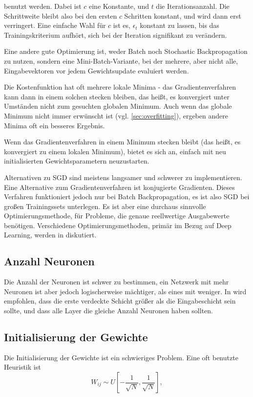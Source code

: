 benutzt werden. Dabei ist $c$ eine Konstante, und $t$ die Iterationsanzahl. Die Schrittweite bleibt also bei den ersten $c$ Schritten konstant, und wird dann erst verringert. Eine einfache Wahl für $c$ ist es, $\epsilon_t$ konstant zu lassen, bis das Trainingskriterium aufhört, sich bei der Iteration signifikant zu verändern.

Eine andere gute Optimierung ist, weder Batch noch Stochastic Backpropagation zu nutzen, sondern eine Mini-Batch-Variante, bei der mehrere, aber nicht alle, Eingabevektoren vor jedem Gewichtsupdate evaluiert werden. 

Die Kostenfunktion hat oft mehrere lokale Minima - das Gradientenverfahren kann dann in einem solchen stecken bleiben, das heißt, es konvergiert unter Umständen nicht zum gesuchten globalen Minimum. Auch wenn das globale Minimum nicht immer erwünscht ist (vgl. \ref{sec:overfitting}), ergeben andere Minima oft ein besseres Ergebnis.

Wenn das Gradientenverfahren in einem Minimum stecken bleibt (das heißt, es konvergiert zu einem lokalen Minimum), bietet es sich an, einfach mit neu initialisierten Gewichtsparametern neuzustarten. 

Alternativen zu SGD sind meistens langsamer und schwerer zu implementieren. Eine Alternative zum Gradientenverfahren ist konjugierte Gradienten. Dieses Verfahren funktioniert jedoch nur bei Batch Backpropagation, es ist also SGD bei großen Trainingssets unterlegen. Es ist aber eine durchaus sinnvolle Optimierungsmethode, für Probleme, die genaue reellwertige Ausgabewerte benötigen\cite{lecunefficient}.
Verschiedene Optimierungsmethoden, primär im Bezug auf Deep Learning, werden in \cite{ngiam2011optimization} diskutiert.

\subsection{Anzahl Neuronen}
Die Anzahl der Neuronen ist schwer zu bestimmen, ein Netzwerk mit mehr Neuronen ist aber jedoch logischerweise mächtiger, als eines mit weniger. In \cite{bengio2012practical} wird empfohlen, dass die erste verdeckte Schicht größer als die Eingabeschicht sein sollte, und dass alle Layer die gleiche Anzahl Neuronen haben sollten.

\subsection{Initialisierung der Gewichte}
Die Initialisierung der Gewichte ist ein schwieriges Problem. Eine oft benutzte Heuristik ist 
\begin{equation}
	W_{ij} \sim U [ -\frac{1}{\sqrt{N}} , \frac{1}{\sqrt{N}} ],
\end{equation}

